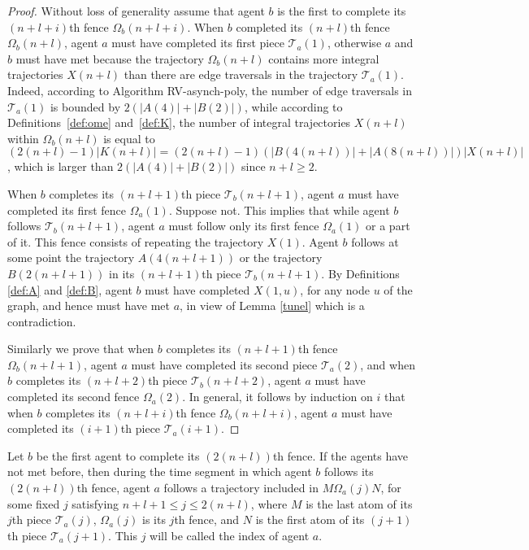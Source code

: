 \documentclass [11pt] {article}
\begin{document}
\begin{proof}
Without loss of generality assume that agent $b$ is the first to complete its $(n+l+i)$th fence 
$\Omega_b(n+l+i)$. When $b$ completed its $(n+l)$th fence $\Omega_b(n+l)$, agent $a$ must have completed its first piece $\mathcal{T}_a(1)$, otherwise $a$ and $b$ must have met because the trajectory $\Omega_b(n+l)$ contains more integral trajectories $X(n+l)$ than there are {edge traversals} in the trajectory $\mathcal{T}_a(1)$. Indeed, according to Algorithm RV-asynch-poly, the number of {edge traversals} in $\mathcal{T}_a(1)$ is bounded by $2(|A(4)|+|B(2)|)$, while according to Definitions~\ref{def:ome} and~\ref{def:K}, the number of integral trajectories $X(n+l)$ within $\Omega_b(n+l)$ is equal to {$(2(n+l)-1)|K(n+l)|=(2(n+l)-1)(|B(4(n+l))|+|A(8(n+l))|)|X(n+l)|$}, which is larger than $2(|A(4)|+|B(2)|)$ since $n+l\geq 2$. 


When $b$ completes its $(n+l+1)$th piece $\mathcal{T}_b(n+l+1)$, agent $a$ must have completed its first fence $\Omega_a(1)$. Suppose not. This implies
that  while agent $b$ follows $\mathcal{T}_b(n+l+1)$, agent $a$ must follow
only its first fence $\Omega_a(1)$ or a part of it. This fence consists of repeating the trajectory
$X(1)$. Agent $b$ follows at some point the trajectory $A(4(n+l+1))$
or the trajectory $B(2(n+l+1))$ in its $(n+l+1)$th piece $\mathcal{T}_b(n+l+1)$.
By Definitions \ref{def:A} and \ref{def:B}, agent $b$ must have completed $X(1,u)$, for any node $u$ of the graph,
and hence must have met $a$, in view of Lemma \ref{tunel} which is a contradiction.

Similarly we prove that when $b$ completes its $(n+l+1)$th fence $\Omega_b(n+l+1)$, agent $a$ must have completed its second piece $\mathcal{T}_a(2)$,
and when $b$ completes its $(n+l+2)$th piece $\mathcal{T}_b(n+l+2)$, agent $a$ must have completed its second fence $\Omega_a(2)$. 
In general, it follows by induction on $i$ that when $b$ completes its $(n+l+i)$th fence $\Omega_b(n+l+i)$, agent $a$ must have completed its $(i+1)$th piece $\mathcal{T}_a(i+1)$.
\end{proof}



\begin{lemma}
\label{claim1}
Let $b$ be the first agent to complete its $(2(n+l))$th fence. If the agents have not met before, then during the time segment in which agent $b$ follows its
$(2(n+l))$th fence, agent $a$ follows a trajectory included in {$M\Omega_a(j)N$}, for some fixed $j$ satisfying $n+l+1\le j \le 2(n+l)$, where {$M$} is the last atom of its $j$th piece $\mathcal{T}_a(j)$, $\Omega_a(j)$ is its $j$th fence,
and {$N$} is the first atom of its $(j+1)$th piece $\mathcal{T}_a(j+1)$.
This $j$ will be called the index of agent $a$.
\end{lemma}
\end{document}
